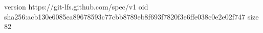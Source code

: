 version https://git-lfs.github.com/spec/v1
oid sha256:acb130e6085ea89678593c77cbb8789eb8f693f7820f3e6ffe038c0e2e02f747
size 82
